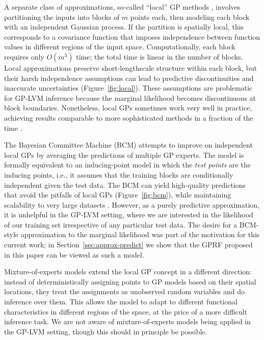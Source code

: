 \documentclass{article}
\begin{document}
A separate class of approximations, so-called ``local'' GP methods
\cite{rasmussen2006, nguyen2009model, park2011domain}, involves
partitioning the inputs into blocks of $m$ points each, then modeling
each block with an independent Gaussian process. If the partition is
spatially local, this corresponds to a covariance function that imposes independence
between function values in different regions of the input
space. Computationally, each block requires only $O(m^3)$ time; the
total time is linear in the number of blocks. Local approximations
preserve short-lengthscale structure within each block, but their harsh independence assumptions can lead to
predictive discontinuities and inaccurate uncertainties
(Figure~\ref{fig:local}). These assumptions are problematic for
GP-LVM inference because the marginal likelihood becomes
discontinuous at block boundaries. Nonetheless, local GPs sometimes
work very well in practice, achieving results comparable to more
sophisticated methods in a fraction of the time \cite{chalupka2012}.

The Bayesian Committee Machine (BCM) \cite{tresp2000bayesian} attempts
to improve on independent local GPs by averaging the predictions of
multiple GP experts. The model is formally equivalent to an inducing-point model in which the {\em test points} are the inducing points,
i.e., it assumes that the training blocks are conditionally
independent given the test data. The BCM can yield high-quality
predictions that avoid the pitfalls of local GPs
(Figure~\ref{fig:bcm}), while
maintaining scalability to very large datasets
\cite{deisenroth2015distributed}. However, as a purely predictive
approximation, it is unhelpful in the GP-LVM setting, where we are
interested in the likelihood of our training set irrespective of any
particular test data.  The desire for a BCM-style approximation to the
marginal likelihood was part of the motivation for this current work;
in Section~\ref{sec:approx-predict} we show that the GPRF proposed in this
paper can be viewed as such a model.

Mixture-of-experts models \cite{rasmussen2002infinite, nguyen2014fast}
extend the local GP concept in a different direction: instead of
deterministically assigning points to GP models based on their spatial
locations, they treat the assignments as unobserved random variables
and do inference over them. This allows the model to adapt to different
functional characteristics in different regions of the space, at the
price of a more difficult inference task. We are not aware of
mixture-of-experts models being applied in the GP-LVM setting, though
this should in principle be possible.
\end{document}
